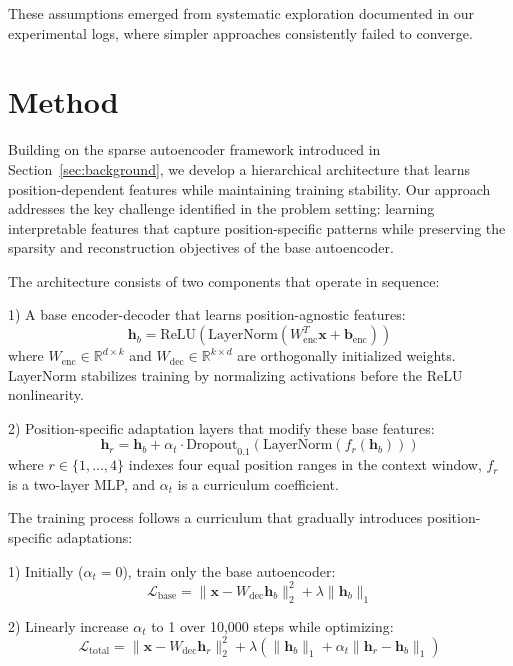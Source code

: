 \documentclass{article} %
\begin{document}
These assumptions emerged from systematic exploration documented in our experimental logs, where simpler approaches consistently failed to converge.

\section{Method}
\label{sec:method}

Building on the sparse autoencoder framework introduced in Section~\ref{sec:background}, we develop a hierarchical architecture that learns position-dependent features while maintaining training stability. Our approach addresses the key challenge identified in the problem setting: learning interpretable features that capture position-specific patterns while preserving the sparsity and reconstruction objectives of the base autoencoder.

The architecture consists of two components that operate in sequence:

1) A base encoder-decoder that learns position-agnostic features:
\begin{equation}
    \mathbf{h}_b = \text{ReLU}(\text{LayerNorm}(W_{\text{enc}}^T \mathbf{x} + \mathbf{b}_{\text{enc}}))
\end{equation}
where $W_{\text{enc}} \in \mathbb{R}^{d \times k}$ and $W_{\text{dec}} \in \mathbb{R}^{k \times d}$ are orthogonally initialized weights. LayerNorm stabilizes training by normalizing activations before the ReLU nonlinearity.

2) Position-specific adaptation layers that modify these base features:
\begin{equation}
    \mathbf{h}_r = \mathbf{h}_b + \alpha_t \cdot \text{Dropout}_{0.1}(\text{LayerNorm}(f_r(\mathbf{h}_b)))
\end{equation}
where $r \in \{1,\ldots,4\}$ indexes four equal position ranges in the context window, $f_r$ is a two-layer MLP, and $\alpha_t$ is a curriculum coefficient.

The training process follows a curriculum that gradually introduces position-specific adaptations:

1) Initially ($\alpha_t = 0$), train only the base autoencoder:
\begin{equation}
    \mathcal{L}_{\text{base}} = \|\mathbf{x} - W_{\text{dec}}\mathbf{h}_b\|_2^2 + \lambda\|\mathbf{h}_b\|_1
\end{equation}

2) Linearly increase $\alpha_t$ to 1 over 10,000 steps while optimizing:
\begin{equation}
    \mathcal{L}_{\text{total}} = \|\mathbf{x} - W_{\text{dec}}\mathbf{h}_r\|_2^2 + \lambda(\|\mathbf{h}_b\|_1 + \alpha_t\|\mathbf{h}_r - \mathbf{h}_b\|_1)
\end{equation}
\end{document}
